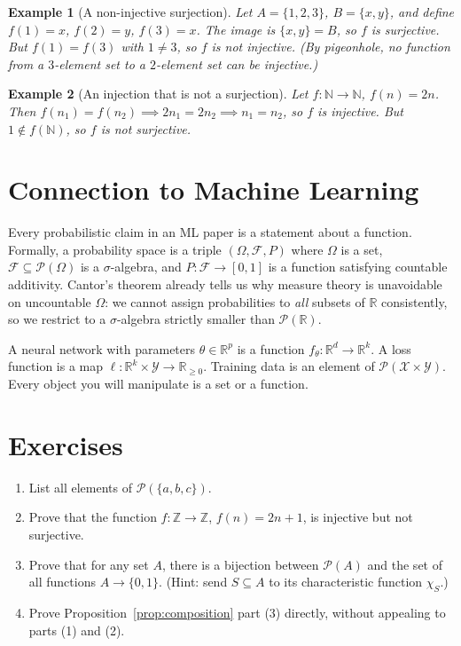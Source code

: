 \documentclass[11pt]{article}
\newtheorem{example}{Example}
\begin{document}
\begin{example}[A non-injective surjection]
Let $A = \{1, 2, 3\}$, $B = \{x, y\}$, and define $f(1) = x$, $f(2) = y$, $f(3) = x$. The image is $\{x, y\} = B$, so $f$ is surjective. But $f(1) = f(3)$ with $1 \ne 3$, so $f$ is not injective. (By pigeonhole, no function from a $3$-element set to a $2$-element set can be injective.)
\end{example}

\begin{example}[An injection that is not a surjection]
Let $f : \mathbb{N} \to \mathbb{N}$, $f(n) = 2n$. Then $f(n_1) = f(n_2) \implies 2n_1 = 2n_2 \implies n_1 = n_2$, so $f$ is injective. But $1 \notin f(\mathbb{N})$, so $f$ is not surjective.
\end{example}

\section*{Connection to Machine Learning}

Every probabilistic claim in an ML paper is a statement about a function. Formally, a probability space is a triple $(\Omega, \mathcal{F}, P)$ where $\Omega$ is a set, $\mathcal{F} \subseteq \mathcal{P}(\Omega)$ is a $\sigma$-algebra, and $P : \mathcal{F} \to [0, 1]$ is a function satisfying countable additivity. Cantor's theorem already tells us why measure theory is unavoidable on uncountable $\Omega$: we cannot assign probabilities to \emph{all} subsets of $\mathbb{R}$ consistently, so we restrict to a $\sigma$-algebra strictly smaller than $\mathcal{P}(\mathbb{R})$.

A neural network with parameters $\theta \in \mathbb{R}^p$ is a function $f_\theta : \mathbb{R}^d \to \mathbb{R}^k$. A loss function is a map $\ell : \mathbb{R}^k \times \mathcal{Y} \to \mathbb{R}_{\ge 0}$. Training data is an element of $\mathcal{P}(\mathcal{X} \times \mathcal{Y})$. Every object you will manipulate is a set or a function.

\section*{Exercises}

\begin{enumerate}
  \item List all elements of $\mathcal{P}(\{a, b, c\})$.
  \item Prove that the function $f : \mathbb{Z} \to \mathbb{Z}$, $f(n) = 2n + 1$, is injective but not surjective.
  \item Prove that for any set $A$, there is a bijection between $\mathcal{P}(A)$ and the set of all functions $A \to \{0, 1\}$. (Hint: send $S \subseteq A$ to its characteristic function $\chi_S$.)
  \item Prove Proposition~\ref{prop:composition} part (3) directly, without appealing to parts (1) and (2).
\end{enumerate}
\end{document}
